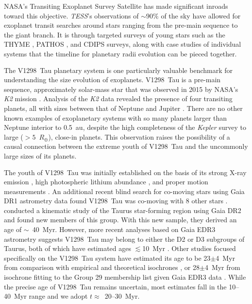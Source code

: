 \documentclass[linenumbers,twocolumn]{aastex631}
\newcommand{\tess}{\textit{TESS}}
\newcommand{\sname}{V1298~Tau\xspace}
\newcommand{\rearth}{$R_\oplus$\xspace}
\begin{document}
NASA's Transiting Exoplanet Survey Satellite \citep[\tess;][]{Ricker2015} has made significant inroads toward this objective. \tess's observations of $\sim 90 \%$ of the sky have allowed for exoplanet transit searches around stars ranging from the pre-main sequence to the giant branch. It is through targeted surveys of young stars such as the THYME \citep[e.g.][]{Newton2019}, PATHOS \citep[e.g.][]{Nardiello2020}, and CDIPS \citep[e.g.][]{Bouma2020} surveys, along with case studies of individual systems \citep[e.g.][]{benatti19, Plavchan2020, Hedges2021, Zhou2021} that the timeline for planetary radii evolution can be pieced together. 

The \sname planetary system is one particularly valuable benchmark for understanding the size evolution of exoplanets. \sname is a pre-main sequence, approximately solar-mass star that was observed in 2015 by NASA's \textit{K2} mission \citep{Howell2014}. Analysis of the \textit{K2} data revealed the presence of four transiting planets, all with sizes between that of Neptune and Jupiter \citep{David2019a, David2019b}. There are no other known examples of exoplanetary systems with so many planets larger than Neptune interior to 0.5~au, despite the high completeness of the \textit{Kepler} survey to large ($>5$~\rearth), close-in planets. This observation raises the possibility of a causal connection between the extreme youth of \sname and the uncommonly large sizes of its planets.  

The youth of \sname was initially established on the basis of its strong X-ray emission \citep{Wichmann1996}, high photospheric lithium abundance \citep{Wichmann2000}, and proper motion measurements \citep{frink1997}. An additional recent blind search for co-moving stars using Gaia DR1 astrometry data found \sname was co-moving with 8 other stars \citep[Group 29 in][]{Oh2017}. \cite{Luhman2018} conducted a kinematic study of the Taurus star-forming region using Gaia DR2 and found new members of this group. With this new sample, they derived an age of $\sim$~40~Myr. However, more recent analyses based on Gaia EDR3 astrometry suggests \sname may belong to either the D2 or D3 subgroups of Taurus, both of which have estimated ages $\lesssim$10~Myr \citep{gaidos21, Krolikowski2021}. Other studies focused specifically on the \sname system have estimated its age to be 23$\pm$4~Myr from comparison with empirical and theoretical isochrones \citep{David2019b}, or 28$\pm$4~Myr from isochrone fitting to the \citet{Luhman2018} Group 29 membership list given Gaia EDR3 data \citep{johnson21}. While the precise age of \sname remains uncertain, most estimates fall in the 10--40~Myr range and we adopt $t \approx$~20--30~Myr.
\end{document}
